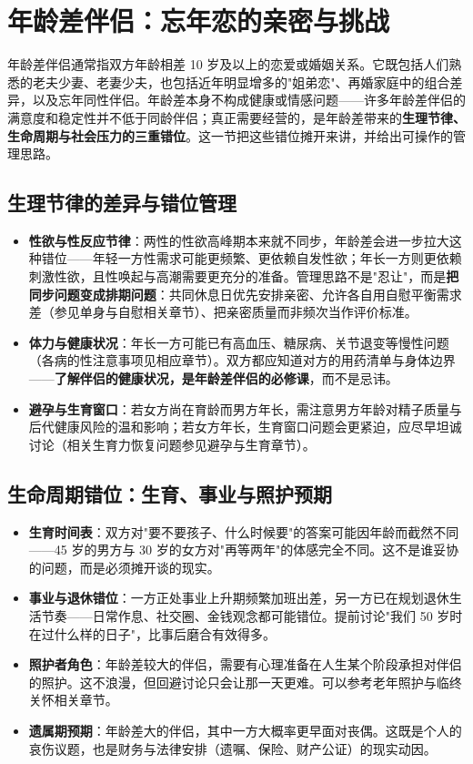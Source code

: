 \section{年龄差伴侣：忘年恋的亲密与挑战}

年龄差伴侣通常指双方年龄相差 10 岁及以上的恋爱或婚姻关系。它既包括人们熟悉的老夫少妻、老妻少夫，也包括近年明显增多的"姐弟恋"、再婚家庭中的组合差异，以及忘年同性伴侣。年龄差本身不构成健康或情感问题——许多年龄差伴侣的满意度和稳定性并不低于同龄伴侣；真正需要经营的，是年龄差带来的\textbf{生理节律、生命周期与社会压力的三重错位}。这一节把这些错位摊开来讲，并给出可操作的管理思路。

\subsection{生理节律的差异与错位管理}

\begin{itemize}
\item \textbf{性欲与性反应节律}：两性的性欲高峰期本来就不同步，年龄差会进一步拉大这种错位——年轻一方性需求可能更频繁、更依赖自发性欲；年长一方则更依赖刺激性欲，且性唤起与高潮需要更充分的准备。管理思路不是"忍让"，而是\textbf{把同步问题变成排期问题}：共同休息日优先安排亲密、允许各自用自慰平衡需求差（参见单身与自慰相关章节）、把亲密质量而非频次当作评价标准。
\item \textbf{体力与健康状况}：年长一方可能已有高血压、糖尿病、关节退变等慢性问题（各病的性注意事项见相应章节）。双方都应知道对方的用药清单与身体边界——\textbf{了解伴侣的健康状况，是年龄差伴侣的必修课}，而不是忌讳。
\item \textbf{避孕与生育窗口}：若女方尚在育龄而男方年长，需注意男方年龄对精子质量与后代健康风险的温和影响；若女方年长，生育窗口问题会更紧迫，应尽早坦诚讨论（相关生育力恢复问题参见避孕与生育章节）。
\end{itemize}

\subsection{生命周期错位：生育、事业与照护预期}

\begin{itemize}
\item \textbf{生育时间表}：双方对"要不要孩子、什么时候要"的答案可能因年龄而截然不同——45 岁的男方与 30 岁的女方对"再等两年"的体感完全不同。这不是谁妥协的问题，而是必须摊开谈的现实。
\item \textbf{事业与退休错位}：一方正处事业上升期频繁加班出差，另一方已在规划退休生活节奏——日常作息、社交圈、金钱观念都可能错位。提前讨论"我们 50 岁时在过什么样的日子"，比事后磨合有效得多。
\item \textbf{照护者角色}：年龄差较大的伴侣，需要有心理准备在人生某个阶段承担对伴侣的照护。这不浪漫，但回避讨论只会让那一天更难。可以参考老年照护与临终关怀相关章节。
\item \textbf{遗属期预期}：年龄差大的伴侣，其中一方大概率更早面对丧偶。这既是个人的哀伤议题，也是财务与法律安排（遗嘱、保险、财产公证）的现实动因。
\end{itemize}

